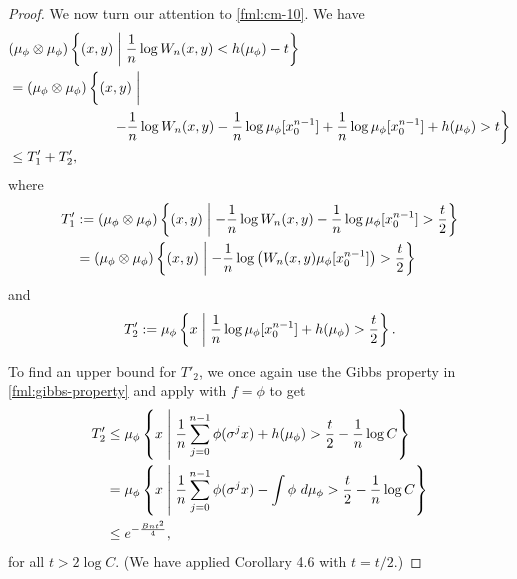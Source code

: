 \begin{theorem}
\begin{proof}
		We now turn our attention to \eqref{fml:cm-10}. We have
		\begin{align*}
			&(\mu_\phi \otimes \mu_\phi)\left\{(x, y) \midmid \frac{1}{n}\log{W_n(x, y)} < h(\mu_\phi) - t\right\} \\
				&= (\mu_\phi \otimes \mu_\phi)\left\{(x, y) \midmid \vphantom{\frac{1}{n}} \right. \\
				&\hspace{26mm} \left. -\frac{1}{n}\log{W_n(x, y)} - \frac{1}{n}\log{\mu_\phi[x_0^{n - 1}]} + \frac{1}{n}\log{\mu_\phi[x_0^{n - 1}]} + h(\mu_\phi) > t\right\} \\
				&\leq T'_1 + T'_2,
		\end{align*}
		where
		\begin{align*}
			T'_1 &:= (\mu_\phi \otimes \mu_\phi)\left\{(x, y) \mathrel{}\middle|\mathrel{} -\frac{1}{n}\log{W_n(x, y)} - \frac{1}{n}\log{\mu_\phi[x_0^{n - 1}]} > \frac{t}{2}\right\} \\
				&= (\mu_\phi \otimes \mu_\phi)\left\{(x, y) \mathrel{}\middle|\mathrel{} -\frac{1}{n}\log\left(W_n(x, y) \mu_\phi[x_0^{n - 1}]\right) > \frac{t}{2}\right\}
		\end{align*}
		and
		\[
			T'_2 := \mu_\phi \left\{x \mathrel{}\middle|\mathrel{} \frac{1}{n}\log{\mu_\phi[x_0^{n - 1}]} + h(\mu_\phi) > \frac{t}{2}\right\}.
		\]
		
		To find an upper bound for $T'_2$, we once again use the Gibbs property in \eqref{fml:gibbs-property} and apply  with $f = \phi$ to get
		\begin{align*}
			T'_2 &\leq \mu_\phi\left\{x \mathrel{}\middle|\mathrel{} \frac{1}{n}\sum_{j = 0}^{n - 1}{\phi(\sigma^j{x})} + h(\mu_\phi) > \frac{t}{2} - \frac{1}{n}\log{C}\right\} \\
				&= \mu_\phi\left\{x \mathrel{}\middle|\mathrel{} \frac{1}{n}\sum_{j = 0}^{n - 1}{\phi(\sigma^j{x})} - \int{\phi\ d\mu_\phi} > \frac{t}{2} - \frac{1}{n}\log{C}\right\} \\
				&\leq e^{-\frac{Bnt^2}{4}},
		\end{align*}
		for all $t > 2\log{C}$. (We have applied Corollary 4.6 with $t = t / 2$.)
		

\end{proof}
\end{theorem}
